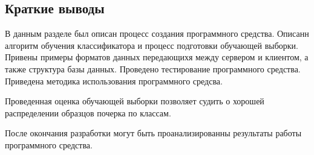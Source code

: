 \subsection{Краткие выводы}

В данным разделе был описан процесс создания программного средства. Описанн алгоритм обучения классификатора и процесс подготовки обучающей выборки. Привены примеры форматов данных передающихя между сервером и клиентом, а также структура базы данных. Проведено тестирование программного средства. Приведена методика использования программного средсва. 

Проведенная оценка обучающей выборки позволяет судить о хорошей распределении образцов почерка по классам.

После окончания разработки могут быть проанализированны результаты работы программного средства.